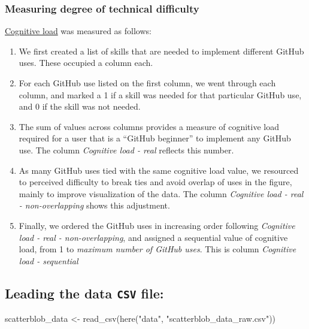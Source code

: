 \documentclass[
  11pt,
]{article}
\newenvironment{Shaded}{\begin{snugshade}}{\end{snugshade}}
\newcommand{\FunctionTok}[1]{\textcolor[rgb]{0.00,0.00,0.00}{#1}}
\newcommand{\NormalTok}[1]{#1}
\newcommand{\OtherTok}[1]{\textcolor[rgb]{0.56,0.35,0.01}{#1}}
\newcommand{\StringTok}[1]{\textcolor[rgb]{0.31,0.60,0.02}{#1}}
\providecommand{\tightlist}{%
  \setlength{\itemsep}{0pt}\setlength{\parskip}{0pt}}
\begin{document}
\hypertarget{measuring-degree-of-technical-difficulty}{%
\subsubsection{Measuring degree of technical difficulty}\label{measuring-degree-of-technical-difficulty}}

\href{https://docs.google.com/spreadsheets/d/1YipCCdg5Z8w-IQO67rFfMBSTpLjO-_7HiW44gqzTXPM/edit\#gid=0}{Cognitive load} was measured as follows:

\begin{enumerate}
\def\labelenumi{\arabic{enumi}.}
\tightlist
\item
  We first created a list of skills that are needed to implement different GitHub uses. These occupied a column each.
\item
  For each GitHub use listed on the first column, we went through each column, and marked a 1 if a skill was needed for that particular GitHub use, and 0 if the skill was not needed.
\item
  The sum of values across columns provides a measure of cognitive load required for a user that is a ``GitHub beginner'' to implement any GitHub use. The column \emph{Cognitive load - real} reflects this number.
\item
  As many GitHub uses tied with the same cognitive load value, we resourced to perceived difficulty to break ties and avoid overlap of uses in the figure, mainly to improve visualization of the data. The column \emph{Cognitive load - real - non-overlapping} shows this adjustment.
\item
  Finally, we ordered the GitHub uses in increasing order following \emph{Cognitive load - real - non-overlapping}, and assigned a sequential value of cognitive load, from 1 to \emph{maximum number of GitHub uses}. This is column \emph{Cognitive load - sequential}
\end{enumerate}

\hypertarget{leading-the-data-csv-file}{%
\subsection{\texorpdfstring{Leading the data \texttt{CSV} file:}{Leading the data CSV file:}}\label{leading-the-data-csv-file}}

\begin{Shaded}
\begin{Highlighting}[]
\NormalTok{scatterblob\_data }\OtherTok{\textless{}{-}} \FunctionTok{read\_csv}\NormalTok{(}\FunctionTok{here}\NormalTok{(}\StringTok{"data"}\NormalTok{, }\StringTok{"scatterblob\_data\_raw.csv"}\NormalTok{))}
\end{Highlighting}
\end{Shaded}
\end{document}
